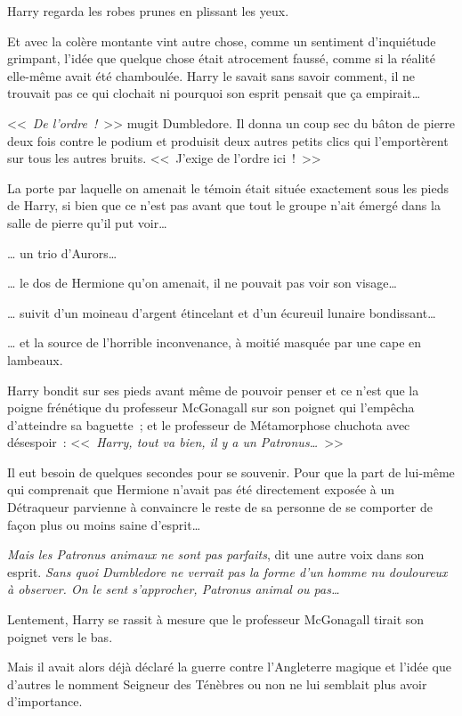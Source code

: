 Harry regarda les robes prunes en plissant les yeux.

Et avec la colère montante vint autre chose, comme un sentiment d'inquiétude grimpant, l'idée que quelque chose était atrocement faussé, comme si la réalité elle-même avait été chamboulée. Harry le savait sans savoir comment, il ne trouvait pas ce qui clochait ni pourquoi son esprit pensait que ça empirait…

<<~\emph{De l'ordre~!}~>> mugit Dumbledore. Il donna un coup sec du bâton de pierre deux fois contre le podium et produisit deux autres petits clics qui l'emportèrent sur tous les autres bruits. <<~J'exige de l'ordre ici~!~>>

La porte par laquelle on amenait le témoin était située exactement sous les pieds de Harry, si bien que ce n'est pas avant que tout le groupe n'ait émergé dans la salle de pierre qu'il put voir…

… un trio d'Aurors…

… le dos de Hermione qu'on amenait, il ne pouvait pas voir son visage…

… suivit d'un moineau d'argent étincelant et d'un écureuil lunaire bondissant…

… et la source de l'horrible inconvenance, à moitié masquée par une cape en lambeaux.

Harry bondit sur ses pieds avant même de pouvoir penser et ce n'est que la poigne frénétique du professeur McGonagall sur son poignet qui l'empêcha d'atteindre sa baguette~; et le professeur de Métamorphose chuchota avec désespoir~: <<~\emph{Harry, tout va bien, il y a un Patronus…}~>>

Il eut besoin de quelques secondes pour se souvenir. Pour que la part de lui-même qui comprenait que Hermione n'avait pas été directement exposée à un Détraqueur parvienne à convaincre le reste de sa personne de se comporter de façon plus ou moins saine d'esprit…

\emph{Mais les Patronus animaux ne sont pas parfaits}, dit une autre voix dans son esprit. \emph{Sans quoi Dumbledore ne verrait pas la forme d'un homme nu douloureux à observer. On le sent s'approcher, Patronus animal ou pas…}

Lentement, Harry se rassit à mesure que le professeur McGonagall tirait son poignet vers le bas.

Mais il avait alors déjà déclaré la guerre contre l'Angleterre magique et l'idée que d'autres le nomment Seigneur des Ténèbres ou non ne lui semblait plus avoir d'importance.

